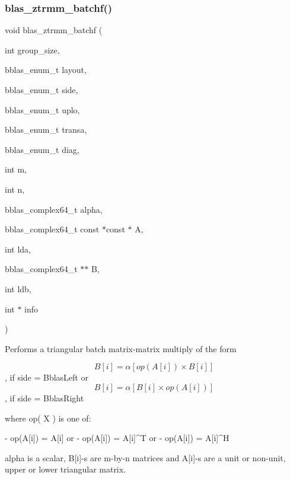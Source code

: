 \subsubsection{\texorpdfstring{blas\+\_\+ztrmm\+\_\+batchf()}{blas\_ztrmm\_batchf()}}
{\footnotesize\ttfamily void blas\+\_\+ztrmm\+\_\+batchf (\begin{DoxyParamCaption}\item[{int}]{group\+\_\+size,  }\item[{bblas\+\_\+enum\+\_\+t}]{layout,  }\item[{bblas\+\_\+enum\+\_\+t}]{side,  }\item[{bblas\+\_\+enum\+\_\+t}]{uplo,  }\item[{bblas\+\_\+enum\+\_\+t}]{transa,  }\item[{bblas\+\_\+enum\+\_\+t}]{diag,  }\item[{int}]{m,  }\item[{int}]{n,  }\item[{bblas\+\_\+complex64\+\_\+t}]{alpha,  }\item[{bblas\+\_\+complex64\+\_\+t const $\ast$const $\ast$}]{A,  }\item[{int}]{lda,  }\item[{bblas\+\_\+complex64\+\_\+t $\ast$$\ast$}]{B,  }\item[{int}]{ldb,  }\item[{int $\ast$}]{info }\end{DoxyParamCaption})}

Performs a triangular batch matrix-\/matrix multiply of the form

\[B[i] = \alpha [op( A[i] ) \times B[i]] \], if side = Bblas\+Left or \[B[i] = \alpha [B[i] \times op( A[i]) ] \], if side = Bblas\+Right

where op( X ) is one of\+: \begin{DoxyVerb}    - op(A[i]) = A[i]   or
    - op(A[i]) = A[i]^T or
    - op(A[i]) = A[i]^H
\end{DoxyVerb}


alpha is a scalar, B\mbox{[}i\mbox{]}-\/s are m-\/by-\/n matrices and A\mbox{[}i\mbox{]}-\/s are a unit or non-\/unit, upper or lower triangular matrix.


